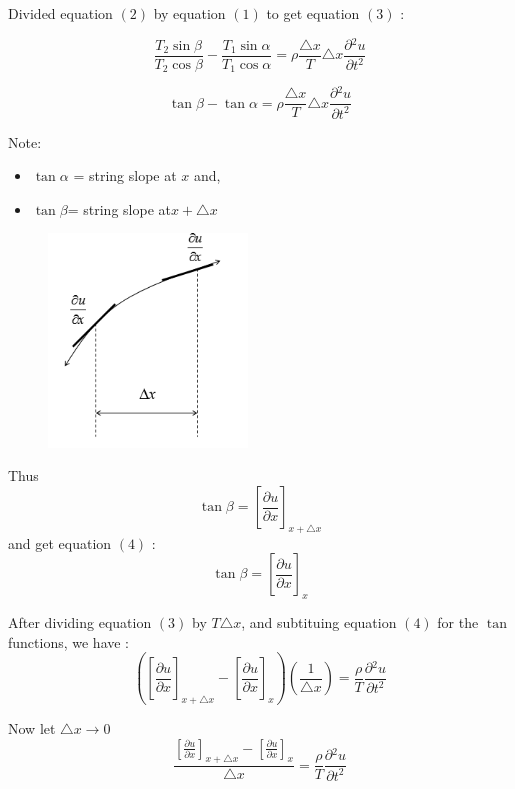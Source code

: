 \documentclass[12pt,a4paper]{article}
\begin{document}
	Divided equation $(2)$ by equation $(1)$ to get equation $(3)$ :
	
	$$\frac{T_2 \sin \beta}{T_2 \cos \beta}-\frac{T_1 \sin \alpha}{T_1 \cos \alpha} = \rho \frac{\triangle x}{T} \triangle x \frac{\partial{^2 u}}{\partial{t^2}}$$

	\begin{equation}\label{} \tan \beta - \tan \alpha = \rho \frac{\triangle x}{T} \triangle x \frac{\partial{^2 u}}{\partial{t^2}}
	\end{equation}
	
	Note:
	\begin{itemize}
	\item $\tan\alpha$ = string slope at $x $ and,\\
	\item $\tan \beta $= string slope at$ x + \triangle x$
	\end{itemize}

	\begin{figure}[h]
		\begin{center}
			\includegraphics[width=200px]{wave4.PNG}
		\end{center}
	\end{figure}
	\pagebreak
	Thus
	$$\tan \beta = [\frac{\partial{u}} {\partial {x}}]_{x+\triangle x}$$
	and get equation $(4)$ :
	\begin{equation}\label{}
	\tan \beta = [\frac{\partial{u}} {\partial {x}}]_x
	\end{equation}
	
	After dividing equation $(3)$ by $T\triangle x $, and subtituing equation $(4)$ for the $\tan$ functions, we have :
	$$([\frac{\partial{u}}{\partial{x}}]_{x+\triangle x}-[\frac{\partial{u}} {\partial {x}}]_x)(\frac{1}{\triangle x}) = \frac {\rho}{T}\frac{\partial{^2 u}}{\partial{t^2}}$$
	
	Now let $\triangle x \to 0$\\
	$$\frac {[\frac{\partial{u}}{\partial{x}}]_{x+\triangle x}-[\frac{\partial{u}} {\partial {x}}]_x}{\triangle x} = \frac {\rho}{T}\frac{\partial{^2 u}}{\partial{t^2}}$$ 
	
\end{document}
